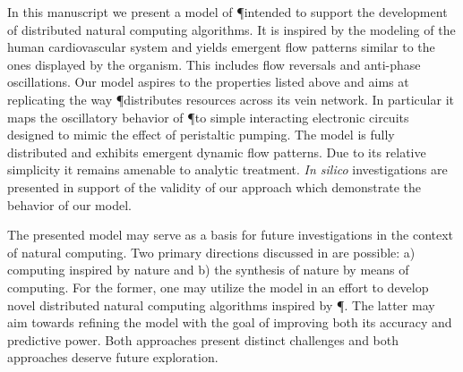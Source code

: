   In this manuscript we present a model of \P intended to support the development of distributed natural computing algorithms. It is inspired by the modeling of the human cardiovascular system and yields emergent flow patterns similar to the ones displayed by the organism. This includes flow reversals and anti-phase oscillations. Our model aspires to the properties listed above and aims at replicating the way \P distributes resources across its vein network. In particular it maps the oscillatory behavior of \P to simple interacting electronic circuits designed to mimic the effect of peristaltic pumping. The model is fully distributed and exhibits emergent dynamic flow patterns. Due to its relative simplicity it remains amenable to analytic treatment. \emph{In silico} investigations are presented in support of the validity of our approach which demonstrate the behavior of our model.

  The presented model may serve as a basis for future investigations in the context of natural computing. Two primary directions discussed in  are possible: a) computing inspired by nature and b) the synthesis of nature by means of computing. For the former, one may utilize the model in an effort to develop novel distributed natural computing algorithms inspired by \P. The latter may aim towards refining the model with the goal of improving both its accuracy and predictive power. Both approaches present distinct challenges and both approaches deserve future exploration.
